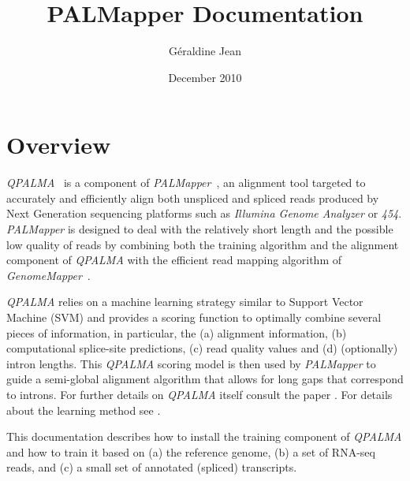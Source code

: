 \documentclass{article}
\begin{document}
\newcommand{\PALMA}{{\sl PALMA}}
\newcommand{\PALMapper}{{\sl PALMapper}}
\newcommand{\GM}{{\sl GenomeMapper}}
\newcommand{\Galaxy}{{\sl Galaxy}}
\newcommand{\mGene}{{\sl mGene}}
\newcommand{\ASP}{{\sl ASP}}
\newcommand{\evaluationToolbox}{{\sl evaluationToolbox}}
\newcommand{\QP}{{\sl QPALMA}}
\newcommand{\QPA}{{\sl QPALMA alignment algorithm }}
\newcommand{\QPH}{{\sl QPALMA approximation }}
\newcommand{\QPP}{{\sl QPALMA pipeline }}
\newcommand{\qparam}[1]{{\bf #1}}



\setlength{\parindent}{0cm}


\title{PALMapper Documentation}
\author{G\'eraldine Jean}
\date{December 2010}

\maketitle
%
%
%

\section{Overview}
\label{sec:overview}
\QP{}~\cite{DeBona08} is a component of \PALMapper{}~\cite{Palmapper},
an alignment tool targeted to accurately and efficiently align both
unspliced and spliced reads produced by Next Generation sequencing
platforms such as \emph{Illumina Genome Analyzer} or
\emph{454}. \PALMapper{} is designed to deal with the relatively short
length and the possible low quality of reads by combining both the
training algorithm and the alignment component of \QP{} with the
efficient read mapping algorithm of \GM{}~\cite{GenomeMapper}. 

\QP{} relies on a machine learning strategy similar to Support Vector
Machine (SVM) and provides a scoring function to optimally combine
several pieces of information, in particular, the (a) alignment
information, (b) computational splice-site predictions, (c) read
quality values and (d) (optionally) intron lengths. This \QP{}
scoring model is then used by \PALMapper{} to guide a semi-global
alignment algorithm that allows for long gaps that correspond to
introns. For further details on \QP{} itself consult the paper
\cite{DeBona08}. For details about the learning method see
\cite{Tsochantaridis04}.

This documentation describes how to install the training component of
\QP{} and how to train it based on (a) the reference genome, (b) a 
set of RNA-seq reads,  and (c) a small set of annotated (spliced)
transcripts. 
\end{document}
